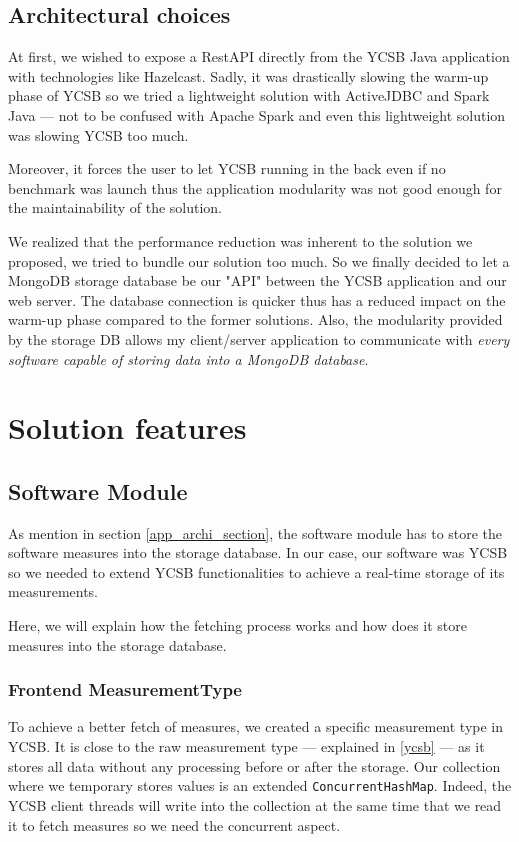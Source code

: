 \documentclass[a4paper,11pt]{report}
\begin{document}
\subsection{Architectural choices}

At first, we wished to expose a RestAPI directly from the YCSB Java application with technologies like Hazelcast. Sadly, it was drastically slowing the warm-up phase of YCSB so we tried a lightweight solution with ActiveJDBC and Spark Java --- not to be confused with Apache Spark and even this lightweight solution was slowing YCSB too much. 

Moreover, it forces the user to let YCSB running in the back even if no benchmark was launch thus the application modularity was not good enough for the maintainability of the solution. 

We realized that the performance reduction was inherent to the solution we proposed, we tried to bundle our solution too much. So we finally decided to let a MongoDB storage database be our "API" between the YCSB application and our web server. The database connection is quicker thus has a reduced impact on the warm-up phase compared to the former solutions. Also, the modularity provided by the storage DB allows my client/server application to communicate with \textit{every software capable of storing data into a MongoDB database}.

\section{Solution features}\label{technical_description}

\subsection{Software Module}

As mention in section \ref{app_archi_section}, the software module has to store the software measures into the storage database. In our case, our software was YCSB so we needed to extend YCSB functionalities to achieve a real-time storage of its measurements. 

Here, we will explain how the fetching process works and how does it store measures into the storage database.

\subsubsection{Frontend MeasurementType} To achieve a better fetch of measures, we created a specific measurement type in YCSB. It is close to the raw measurement type --- explained in \ref{ycsb} --- as it stores all data without any processing before or after the storage. Our collection where we temporary stores values is an extended \texttt{ConcurrentHashMap}. Indeed, the YCSB client threads will write into the collection at the same time that we read it to fetch measures so we need the concurrent aspect.
\end{document}
